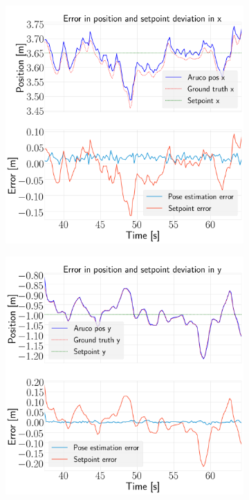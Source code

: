 \documentclass[../Head/report.tex]{subfiles}
\begin{document}
\begin{figure}[H]
    \centering
    \begin{subfigure}[t]{.30\textwidth}
        \centering
        \includegraphics[width=\textwidth]{../Figures/hold_pose_using_aruco_pose_estimation/pose_error_x_test2.png}
        \caption{}
        \label{fig:hold_pose_estimation_test2_x}
    \end{subfigure}
     \hspace{0.2em}
    \begin{subfigure}[t]{.30\textwidth}
        \centering
        \includegraphics[width=\textwidth]{../Figures//hold_pose_using_aruco_pose_estimation/pose_error_y_test2.png}

\end{subfigure}
\end{figure}
\end{document}
